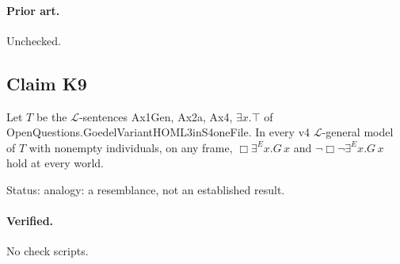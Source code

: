 \documentclass{article}
\begin{document}
\paragraph{Prior art.} Unchecked.

\subsection*{Claim K9}

Let $T$ be the $\mathcal L$-sentences Ax1Gen, Ax2a, Ax4, $\exists x.\top$ of OpenQuestions.GoedelVariantHOML3inS4oneFile. In every v4 $\mathcal L$-general model of $T$ with nonempty individuals, on any frame, $\Box\exists^E x.G\,x$ and $\neg\Box\neg\exists^E x.G\,x$ hold at every world.

Status: analogy: a resemblance, not an established result.

\paragraph{Verified.}
No check scripts.
\end{document}
